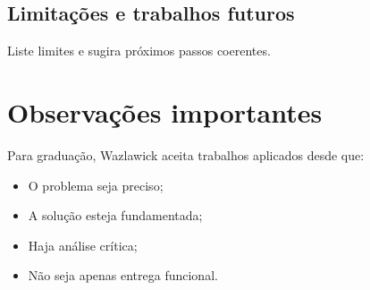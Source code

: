 \documentclass[
    12pt,                %
    openright,           %
    oneside,             %
    a4paper,             %
    english,             %
    brazil               %
]{abntex2}
\begin{document}
\section{Limitações e trabalhos futuros}
Liste limites e sugira próximos passos coerentes.

\chapter*{Observações importantes}

Para graduação, Wazlawick aceita trabalhos aplicados desde que:
\begin{itemize}
    \item O problema seja preciso;
    \item A solução esteja fundamentada;
    \item Haja análise crítica;
    \item Não seja apenas entrega funcional.
\end{itemize}


\postextual

%
%


%
%
%
\end{document}
